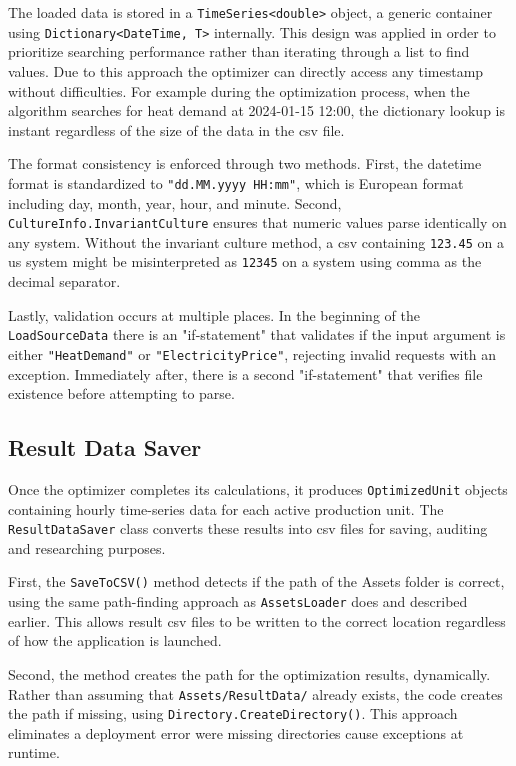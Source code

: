 The loaded data is stored in a \texttt{TimeSeries<double>} object, a generic container using \texttt{Dictionary<DateTime, T>} internally.
This design was applied in order to prioritize searching performance rather than iterating through a list to find values.
Due to this approach the optimizer can directly access any timestamp without difficulties. For example during the optimization process,
when the algorithm searches for heat demand at 2024-01-15 12:00, the dictionary lookup is instant regardless of the  size of the data in
the \acrshort{csv} file.

The format consistency is enforced through two methods. First, the datetime format is standardized to \texttt{"dd.MM.yyyy HH:mm"},
which is European format including day, month, year, hour, and minute. Second, \texttt{CultureInfo.InvariantCulture}
ensures that numeric values parse identically on any system. Without the invariant culture method, a \acrshort{csv} containing \texttt{123.45}
on a \acrshort{us} system might be misinterpreted as \texttt{12345} on a system using comma as the decimal separator.

Lastly, validation occurs at multiple places. In the beginning of the \texttt{LoadSourceData} there is an "if-statement" that validates if the input argument is either \texttt{"HeatDemand"} or \texttt{"ElectricityPrice"}, rejecting invalid requests with an exception.
Immediately after, there is a second "if-statement" that verifies file existence before attempting to parse.

\subsection{Result Data Saver}

Once the optimizer completes its calculations, it produces \texttt{OptimizedUnit} objects containing hourly time-series data for each active production unit. The \texttt{ResultDataSaver} class converts these results into \acrshort{csv} files for saving, auditing and researching purposes.

First, the \texttt{SaveToCSV()} method detects if the path of the Assets folder is correct, using the same path-finding approach as \texttt{AssetsLoader} does and described earlier. This allows result \acrshort{csv} files to be written to the correct location regardless of how the application is launched.

Second, the method creates the path for the optimization results, dynamically. Rather than assuming that \texttt{Assets/ResultData/}
already exists, the code creates the path if missing, using \texttt{Directory.CreateDirectory()}.
This approach eliminates a deployment error were missing directories cause exceptions at runtime.

